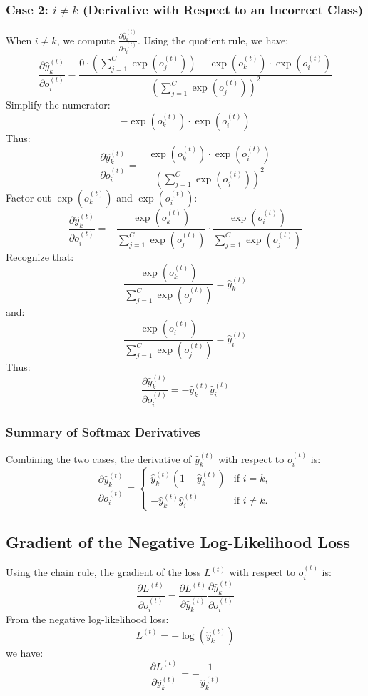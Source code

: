 \begin{notechapter}
\subsubsection{Case 2: \(i \neq k\) (Derivative with Respect to an Incorrect Class)}
When \(i \neq k\), we compute \(\frac{\partial \hat{y}_k^{(t)}}{\partial o_i^{(t)}}\). 
Using the quotient rule, we have:
\[
\frac{\partial \hat{y}_k^{(t)}}{\partial o_i^{(t)}} = 
\frac{0 \cdot \left( \sum_{j=1}^C \exp(o_j^{(t)}) \right) - \exp(o_k^{(t)}) \cdot \exp(o_i^{(t)})}{\left( \sum_{j=1}^C \exp(o_j^{(t)}) \right)^2}
\]
Simplify the numerator:
\[
-\exp(o_k^{(t)}) \cdot \exp(o_i^{(t)})
\]
Thus:
\[
\frac{\partial \hat{y}_k^{(t)}}{\partial o_i^{(t)}} = 
-\frac{\exp(o_k^{(t)}) \cdot \exp(o_i^{(t)})}{\left( \sum_{j=1}^C \exp(o_j^{(t)}) \right)^2}
\]
Factor out \(\exp(o_k^{(t)})\) and \(\exp(o_i^{(t)})\):
\[
\frac{\partial \hat{y}_k^{(t)}}{\partial o_i^{(t)}} = 
-\frac{\exp(o_k^{(t)})}{\sum_{j=1}^C \exp(o_j^{(t)})} \cdot 
\frac{\exp(o_i^{(t)})}{\sum_{j=1}^C \exp(o_j^{(t)})}
\]
Recognize that:
\[
\frac{\exp(o_k^{(t)})}{\sum_{j=1}^C \exp(o_j^{(t)})} = \hat{y}_k^{(t)}
\]
and:
\[
\frac{\exp(o_i^{(t)})}{\sum_{j=1}^C \exp(o_j^{(t)})} = \hat{y}_i^{(t)}
\]
Thus:
\[
\frac{\partial \hat{y}_k^{(t)}}{\partial o_i^{(t)}} = -\hat{y}_k^{(t)} \hat{y}_i^{(t)}
\]

\subsubsection{Summary of Softmax Derivatives}
Combining the two cases, the derivative of \(\hat{y}_k^{(t)}\) with respect to 
\(o_i^{(t)}\) is:
\[
\frac{\partial \hat{y}_k^{(t)}}{\partial o_i^{(t)}} = 
\begin{cases}
\hat{y}_k^{(t)} (1 - \hat{y}_k^{(t)}) & \text{if } i = k, \\
-\hat{y}_k^{(t)} \hat{y}_i^{(t)} & \text{if } i \neq k.
\end{cases}
\]

\subsection{Gradient of the Negative Log-Likelihood Loss}
Using the chain rule, the gradient of the loss \(L^{(t)}\) with respect to 
\(o_i^{(t)}\) is:
\[
\frac{\partial L^{(t)}}{\partial o_i^{(t)}} = 
\frac{\partial L^{(t)}}{\partial \hat{y}_k^{(t)}} 
\frac{\partial \hat{y}_k^{(t)}}{\partial o_i^{(t)}}
\]
From the negative log-likelihood loss:
\[
L^{(t)} = -\log(\hat{y}_k^{(t)})
\]
we have:
\[
\frac{\partial L^{(t)}}{\partial \hat{y}_k^{(t)}} = 
-\frac{1}{\hat{y}_k^{(t)}}
\]


\end{notechapter}
